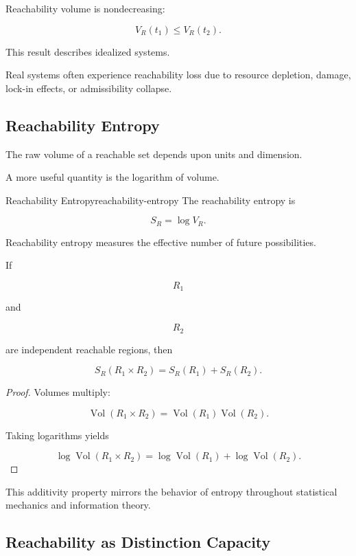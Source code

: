 \documentclass[12pt,twoside,openright]{book}
\newenvironment{prop}
{\begin{proposition}{}{}}
{\end{proposition}}
\newcommand{\Vol}{\operatorname{Vol}}
\begin{document}
\begin{corollary}
Reachability volume is nondecreasing:

\[
V_R(t_1)
\le
V_R(t_2).
\]
\end{corollary}

This result describes idealized systems.

Real systems often experience reachability loss due to
resource depletion, damage, lock-in effects, or
admissibility collapse.

\subsection{Reachability Entropy}

The raw volume of a reachable set depends upon units and
dimension.

A more useful quantity is the logarithm of volume.

\begin{definition}{Reachability Entropy}{reachability-entropy}
The reachability entropy is

\[
S_R
=

\log V_R.
\]
\end{definition}

Reachability entropy measures the effective number of
future possibilities.

\begin{prop}
If

\[
R_1
\]

and

\[
R_2
\]

are independent reachable regions, then

\[
S_R(R_1\times R_2)
=

S_R(R_1)
+
S_R(R_2).
\]
\end{prop}

\begin{proof}
Volumes multiply:

\[
\Vol(R_1\times R_2)
=

\Vol(R_1)\Vol(R_2).
\]

Taking logarithms yields

\[
\log
\Vol(R_1\times R_2)
=

\log\Vol(R_1)
+
\log\Vol(R_2).
\]
\end{proof}

This additivity property mirrors the behavior of entropy
throughout statistical mechanics and information theory.

\subsection{Reachability as Distinction Capacity}
\end{document}
